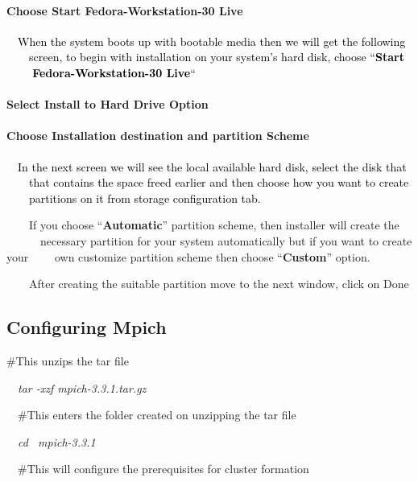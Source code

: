 \documentclass[a4paper]{article}
\newcommand\textstyleStrongEmphasis[1]{\textbf{#1}}
\begin{document}
\paragraph[Choose Start Fedora{}-Workstation{}-30 Live]{\color{black} Choose Start Fedora-Workstation-30 Live}
\textcolor{black}{\ \ When the system boots up with bootable media then we will get the following \ \ \ \ screen, to
begin with installation on your system's hard disk, choose ``}\textstyleStrongEmphasis{\textmd{\textcolor{black}{Start
\ \ \ \ Fedora-Workstation-30 Live}}}\textcolor{black}{{}``}

\paragraph[Select Install to Hard Drive Option]{\color{black} Select Install to Hard Drive Option}
\paragraph[Choose Installation destination and partition Scheme]{\color{black} Choose Installation destination and
partition Scheme}
\textcolor{black}{\ \ In the next screen we will see the local available hard disk, select the disk that \ \ \ \ that
contains the space freed earlier and then choose how you want to create \ \ \ \ partitions on it from storage
configuration tab.}

\ \ \ \ If you choose ``\textstyleStrongEmphasis{Automatic}{}'' partition scheme, then installer will create the
\ \ \ \ \ \ necessary partition for your system automatically but if you want to create your \ \ \ \ own customize
partition scheme then choose ``\textstyleStrongEmphasis{Custom}{}'' option.

\ \ \ \ After creating the suitable partition move to the next window, click on Done


\bigskip


\bigskip

\subsection[Configuring Mpich]{\textmd{Configuring Mpich}}
\#This unzips the tar file

\ \ \textit{tar -xzf mpich-3.3.1.tar.gz}

\ \ \#This enters the folder created on unzipping the tar file

\ \ \textit{cd \ mpich-3.3.1}

\ \ \#This will configure the prerequisites for cluster formation
\end{document}

